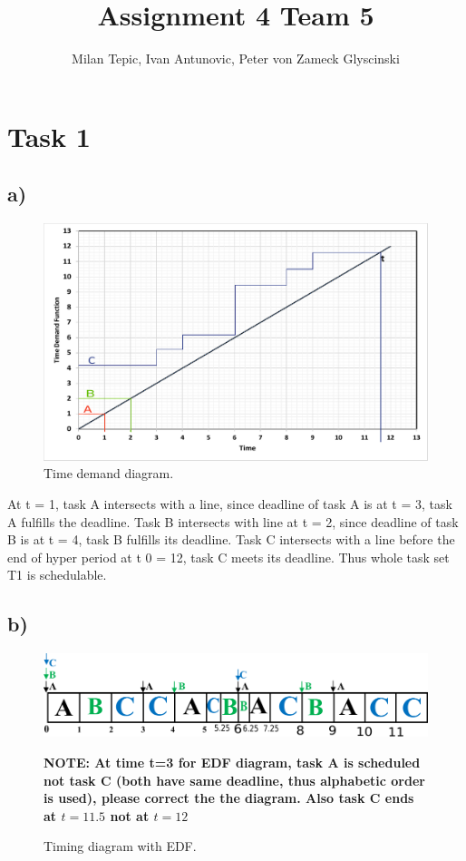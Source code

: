 \documentclass[10pt,a4paper]{article}
\author{Milan Tepic, Ivan Antunovic, Peter von Zameck Glyscinski}
\title{Assignment 4 Team 5}
\begin{document}
\maketitle
\section*{Task 1}
\subsection*{a)}
\begin{figure}[h]
\includegraphics[width=\linewidth]{time-demand-1a.pdf}
\caption{Time demand diagram.} 
\label{fig:1a}
\end{figure}
At t = 1, task A intersects with a line, since deadline of task A is at t = 3, task A fulfills the deadline. Task B intersects with line at t = 2, since deadline of task B is at t = 4, task B fulfills its deadline. Task C intersects with a line before the end of hyper period at t 0 = 12, task C meets its deadline. Thus whole task set T1 is schedulable.

\subsection*{b)}

\begin{figure}[h]
\includegraphics[width=\linewidth]{1b-edf.pdf}
\caption{Timing diagram with EDF.} 

\textbf{NOTE: At time t=3 for EDF diagram, task A is scheduled not task C (both have same deadline, thus alphabetic order is used), please correct the the diagram. Also task C ends at $t=11.5$ not at $t=12$}
\newline 


\label{fig:1bedf}
\end{figure}
\end{document}
